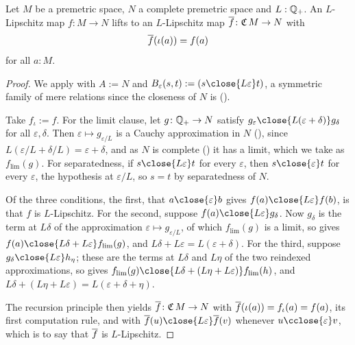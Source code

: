 \begin{theorem}
  \label{liftLipschitzWith}
  Let $M$ be a premetric space, $N$ a complete premetric space and $L : \mathbb{Q}_{+}$. An $L$-Lipschitz map $f \colon M \to N$ lifts to an $L$-Lipschitz map $\overline{f} \colon \mathfrak{C}\,M \to N$ with
  \[
    \overline{f}(\iota(a)) = f(a)
  \]
  for all $a : M$.
\end{theorem}
\begin{proof}
  We apply  with $A := N$ and $B_\varepsilon(s, t) := (s \close{L \varepsilon} t)$, a symmetric family of mere relations since the closeness of $N$ is ().

  Take $f_\iota := f$. For the limit clause, let $g \colon \mathbb{Q}_{+} \to N$ satisfy $g_\varepsilon \close{L(\varepsilon + \delta)} g_\delta$ for all $\varepsilon, \delta$. Then $\varepsilon \mapsto g_{\varepsilon/L}$ is a Cauchy approximation in $N$ (), since $L(\varepsilon/L + \delta/L) = \varepsilon + \delta$, and as $N$ is complete () it has a limit, which we take as $f_{\lim}(g)$. For separatedness, if $s \close{L \varepsilon} t$ for every $\varepsilon$, then $s \close{\varepsilon} t$ for every $\varepsilon$, the hypothesis at $\varepsilon/L$, so $s = t$ by separatedness of $N$.

  Of the three conditions, the first, that $a \close{\varepsilon} b$ gives $f(a) \close{L \varepsilon} f(b)$, is that $f$ is $L$-Lipschitz. For the second, suppose $f(a) \close{L \varepsilon} g_\delta$. Now $g_\delta$ is the term at $L \delta$ of the approximation $\varepsilon \mapsto g_{\varepsilon/L}$, of which $f_{\lim}(g)$ is a limit, so  gives $f(a) \close{L \delta + L \varepsilon} f_{\lim}(g)$, and $L \delta + L \varepsilon = L(\varepsilon + \delta)$. For the third, suppose $g_\delta \close{L \varepsilon} h_\eta$; these are the terms at $L \delta$ and $L \eta$ of the two reindexed approximations, so  gives $f_{\lim}(g) \close{L \delta + (L \eta + L \varepsilon)} f_{\lim}(h)$, and $L \delta + (L \eta + L \varepsilon) = L(\varepsilon + \delta + \eta)$.

  The recursion principle then yields $\overline{f} \colon \mathfrak{C}\,M \to N$ with $\overline{f}(\iota(a)) = f_\iota(a) = f(a)$, its first computation rule, and with $\lift{f}(u) \close{L \varepsilon} \lift{f}(v)$ whenever $u \cclose{\varepsilon} v$, which is to say that $\overline{f}$ is $L$-Lipschitz.
\end{proof}

